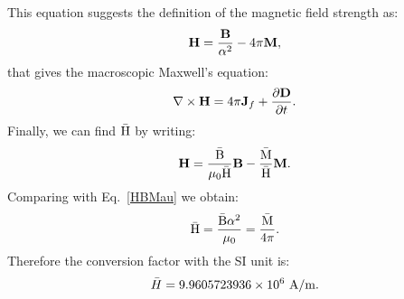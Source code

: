 \documentclass[12pt,a4paper,twoside]{report}
\def\barh{9.9605723936\times 10^{6}}
\begin{document}
{{This equation suggests the definition of the magnetic field strength as:
\begin{equation}
{\bf H}={{\bf B}\over \alpha^2} -4\pi {\bf M},
\label{HBMau}
\end{equation}
that gives the macroscopic Maxwell's equation:
\begin{equation}
\nabla \times {\bf H}= 
{4 \pi} {\bf J}_f +  {\partial {\bf D} \over \partial t}.
\end{equation}
Finally, we can find ${\rm \bar H}$ by writing:
\begin{equation}
{\bf H} = {{\rm \bar B} \over \mu_0 {\rm \bar H}} {\bf B} - {{\rm \bar M} \over {\rm \bar H}} {\bf M}.
\label{HBMgen}
\end{equation}
Comparing with Eq.~\ref{HBMau} we obtain:
\begin{equation}
{\rm \bar H}={{\rm \bar B} \alpha^2 \over \mu_0} = {{\rm \bar M} \over 4 \pi}.
\end{equation}
Therefore the conversion factor with the SI unit is:
\begin{equation}
\bar H = \barh\ {\rm A}/{\rm m}.
\end{equation}
}
\\

}
\end{document}
